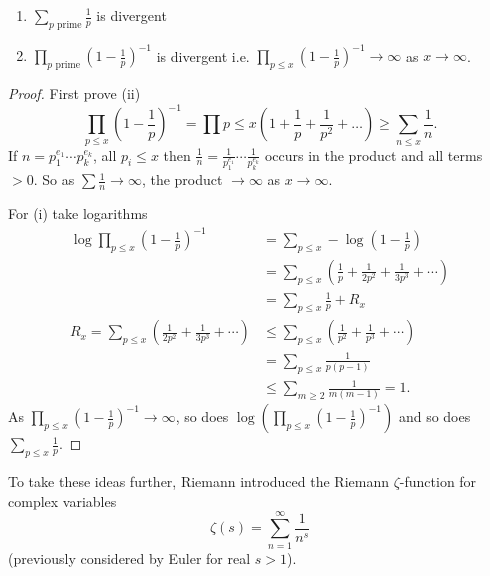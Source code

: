 \documentclass{article}
\begin{document}
\begin{nthm}\label{thm:5.2} \leavevmode
    \begin{enumerate}[label=(\roman*)]
        \item $\sum_{p \text{ prime}} \frac{1}{p}$ is divergent
        \item $\prod_{p \text{ prime}} \left(1 - \frac{1}{p}\right)^{-1}$ is divergent i.e. $\prod_{p \leq x} \left(1 - \frac{1}{p}\right)^{-1} \to \infty$ as $x \to \infty$.
    \end{enumerate}
\end{nthm}

\begin{proof}
    First prove (ii)
    \begin{equation*}
        \prod_{p \leq x} \left(1 - \frac{1}{p}\right)^{-1} = \prod{p \leq x} \left(1 + \frac{1}{p} + \frac{1}{p^2} + \dotsc\right) \geq \sum_{n \leq x} \frac{1}{n}.
    \end{equation*}
    If $n = p_1^{e_1} \dotsm p_k^{e_k}$, all $p_i \leq x$ then $\frac{1}{n} = \frac{1}{p_1^{e_1}} \dotsm \frac{1}{p_k^{e_k}}$ occurs in the product and all terms $>0$.
    So as $\sum \frac{1}{n} \to \infty$, the product $\to \infty$ as $x \to \infty$.

    For (i) take logarithms
    \begin{align*}
        \log \prod_{p \leq x} (1 - \frac{1}{p})^{-1} &= \sum_{p \leq x} -\log(1 - \frac{1}{p}) \\
                                                     &= \sum_{p \leq x} (\frac{1}{p} + \frac{1}{2p^2} + \frac{1}{3p^3} + \dotsb) \\
                                                     &= \sum_{p \leq x} \frac{1}{p} + R_x \\
        R_x = \sum_{p \leq x} (\frac{1}{2p^2} + \frac{1}{3p^3} + \dotsb) &\leq \sum_{p \leq x} (\frac{1}{p^2} + \frac{1}{p^3} + \dotsb) \\
                                                                         &= \sum_{p \leq x} \frac{1}{p(p-1)} \\
                                                                         &\leq \sum_{m \geq 2} \frac{1}{m(m-1)} = 1.
    \end{align*}
    As $\prod_{p \leq x} (1 - \frac{1}{p})^{-1} \to \infty$, so does $\log (\prod_{p \leq x} (1 - \frac{1}{p})^{-1})$ and so does $\sum_{p \leq x} \frac{1}{p}$.
\end{proof}

To take these ideas further, Riemann introduced the Riemann $\zeta$-function for complex variables
\begin{equation*}
    \zeta(s) = \sum_{n = 1}^\infty \frac{1}{n^s}
\end{equation*}
(previously considered by Euler for real $s > 1$).
\end{document}
